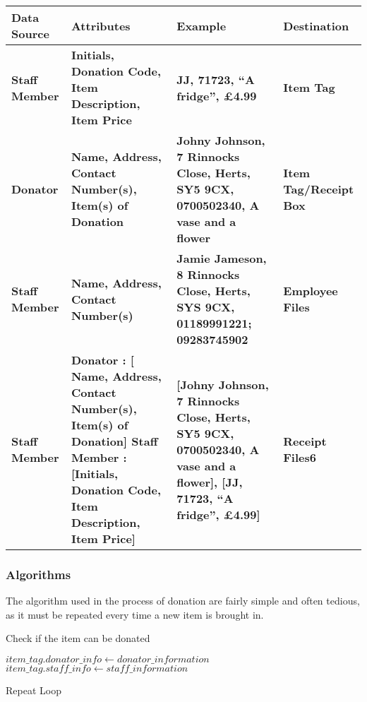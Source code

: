     \begin{tabular}{|p{3cm}|p{4cm}|p{4cm}|p{2cm}|}
        \hline
        \textbf{Data Source} & \textbf{Attributes} & \textbf{Example} & \textbf{Destination}\\ \hline 
        \textbf{Staff Member} & \textbf{Initials, Donation Code, Item Description, Item Price} & \textbf{JJ, 71723, “A fridge”, £4.99} & \textbf{Item Tag}\\ \hline 
        \textbf{Donator} & \textbf{Name, Address, Contact Number(s), Item(s) of Donation} & \textbf{Johny Johnson, 7 Rinnocks Close, Herts, SY5 9CX, 0700502340, A vase and a flower} & \textbf{Item Tag/Receipt Box}\\ \hline
        \textbf{Staff Member} & \textbf{Name, Address, Contact Number(s)} & \textbf{Jamie Jameson, 8 Rinnocks Close, Herts, SYS 9CX, 01189991221; 09283745902} & \textbf{Employee Files}\\ \hline
        \textbf{Staff Member} & \textbf{Donator : [ Name, Address, Contact Number(s), Item(s) of Donation] Staff Member : [Initials, Donation Code, Item Description, Item Price] } & \textbf{[Johny Johnson, 7 Rinnocks Close, Herts, SY5 9CX, 0700502340, A vase and a flower], [JJ, 71723, “A fridge”, £4.99]} & \textbf{Receipt Files6}\\ \hline 
    \end{tabular}

\subsubsection{Algorithms}
The algorithm used in the process  of donation are fairly simple and often tedious, as it must be repeated every time a new item is brought in.


\begin{algorithm}[H]
    \caption{Check if the item can be donated}
\begin{algorithmic}[1]
\EndFunction
\Else
\State $item\_tag.donator\_info \gets  donator\_information$
\State $item\_tag.staff\_info \gets  staff\_information$
\EndIf
\end{algorithmic}
\end{algorithm}

\begin{algorithm}[H]
\label{fig:repeat_pseudo_example}
    \caption{Repeat Loop}
\begin{algorithmic}[1]
\State
\Repeat
\end{algorithmic}
\end{algorithm}

